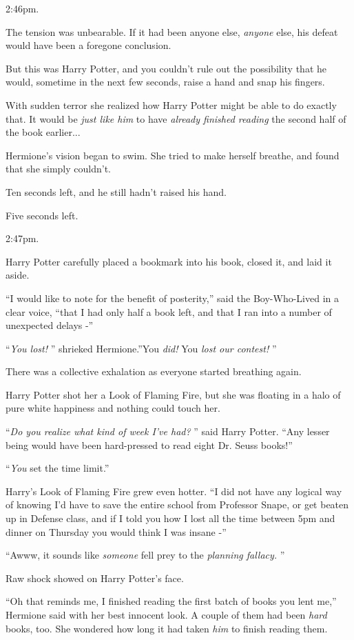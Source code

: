2:46pm.

The tension was unbearable. If it had been anyone else, \emph{anyone}
else, his defeat would have been a foregone conclusion.

But this was Harry Potter, and you couldn't rule out the possibility
that he would, sometime in the next few seconds, raise a hand and snap
his fingers.

With sudden terror she realized how Harry Potter might be able to do
exactly that. It would be \emph{just like him} to have \emph{already
finished reading} the second half of the book earlier...

Hermione's vision began to swim. She tried to make herself breathe, and
found that she simply couldn't.

Ten seconds left, and he still hadn't raised his hand.

Five seconds left.

2:47pm.

Harry Potter carefully placed a bookmark into his book, closed it, and
laid it aside.

``I would like to note for the benefit of posterity,'' said the
Boy-Who-Lived in a clear voice, ``that I had only half a book left, and
that I ran into a number of unexpected delays -''

``\emph{You lost!} '' shrieked Hermione.''You \emph{did!} You \emph{lost
our contest!} ''

There was a collective exhalation as everyone started breathing again.

Harry Potter shot her a Look of Flaming Fire, but she was floating in a
halo of pure white happiness and nothing could touch her.

``\emph{Do you realize what kind of week I've had?} '' said Harry Potter.
``Any lesser being would have been hard-pressed to read eight Dr. Seuss
books!''

``\emph{You} set the time limit.''

Harry's Look of Flaming Fire grew even hotter. ``I did not have any
logical way of knowing I'd have to save the entire school from Professor
Snape, or get beaten up in Defense class, and if I told you how I lost
all the time between 5pm and dinner on Thursday you would think I was
insane -''

``Awww, it sounds like \emph{someone} fell prey to the \emph{planning
fallacy.} ''

Raw shock showed on Harry Potter's face.

``Oh that reminds me, I finished reading the first batch of books you
lent me,'' Hermione said with her best innocent look. A couple of them
had been \emph{hard} books, too. She wondered how long it had taken
\emph{him} to finish reading them.

